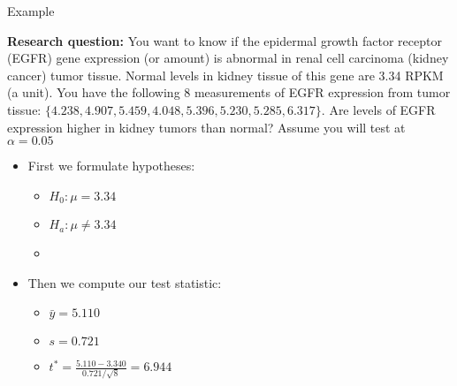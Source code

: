\documentclass[xcolor=dvipsnames]{beamer}
\begin{document}
\begin{frame}{Example}

{\scriptsize  \textbf{Research question:} You want to know if the epidermal growth factor receptor (EGFR) gene expression (or amount) is abnormal in renal cell carcinoma (kidney cancer) tumor tissue. Normal levels in kidney tissue of this gene are 3.34 RPKM (a unit). You have the following 8 measurements of EGFR expression from tumor tissue: $\{4.238, 4.907, 5.459, 4.048, 5.396, 5.230, 5.285, 6.317\}$. Are levels of EGFR expression higher in kidney tumors than normal? Assume you will test at $\alpha = 0.05$} \pause

	\begin{itemize}
		\item First we formulate hypotheses:  \pause
		\begin{itemize}
			\item $H_0: \mu = 3.34$  \pause
			\item $H_a: \mu \neq 3.34$  \pause
			\item[]
		\end{itemize}
	\item Then we compute our test statistic:  \pause
	\begin{itemize}
		\item $\bar{y} = 5.110$  \pause
		\item $s = 0.721$  \pause
		\item $t^* = \frac{5.110 - 3.340}{0.721 / \sqrt{8}} = 6.944$
	\end{itemize}
	\end{itemize}
\end{frame}
\end{document}
